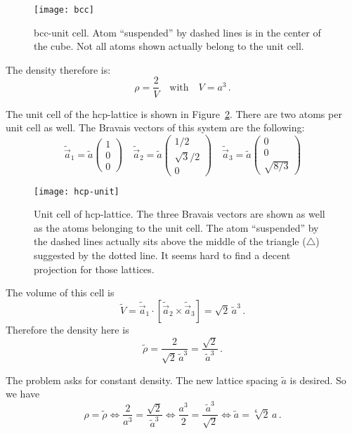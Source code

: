 \documentclass[11pt, english, fleqn, DIV=15, headinclude, BCOR=1cm]{scrartcl}
\begin{document}
\begin{figure}[htbp]
    \centering
    \texttt{[image: bcc]}
    \caption{%
        bcc-unit cell. Atom “suspended” by dashed lines is in the center of the
        cube. Not all atoms shown actually belong to the unit cell.
    }
    \label{fig:bcc}
\end{figure}

The density therefore is:
\[
    \rho = \frac{2}{V}
    \quad\text{with}\quad
    V = a^3 \,.
\]

The unit cell of the hcp-lattice is shown in Figure~\ref{fig:hcp-unit}. There
are two atoms per unit cell as well. The Bravais vectors of this system are the
following:
\[
    \tilde{\vec a}_1 =
    \tilde a
    \begin{pmatrix}
        1 \\ 0 \\ 0
    \end{pmatrix}
    \quad
    \tilde{\vec a}_2 =
    \tilde a
    \begin{pmatrix}
        1/2 \\ \sqrt{3}/2 \\ 0
    \end{pmatrix}
    \quad
    \tilde{\vec a}_3 =
    \tilde a
    \begin{pmatrix}
        0 \\ 0 \\ \sqrt{8/3}
    \end{pmatrix}
\]

\begin{figure}[htbp]
    \centering
    \texttt{[image: hcp-unit]}
    \caption{%
        Unit cell of hcp-lattice. The three Bravais vectors are shown as well
        as the atoms belonging to the unit cell. The atom “suspended” by the
        dashed lines actually sits above the middle of the triangle
        ($\bigtriangleup$) suggested by the dotted line. It seems hard to find
        a decent projection for those lattices.
    }
    \label{fig:hcp-unit}
\end{figure}

The volume of this cell is
\[
    \tilde V = \tilde{\vec a}_1 \cdot [\tilde{\vec a}_2 \times \tilde{\vec
    a}_3] = \sqrt 2 \, \tilde a^3 \,.
\]
Therefore the density here is
\[
    \tilde \rho
    = \frac{2}{\sqrt 2 \, \tilde a^3}
    = \frac{\sqrt 2}{\tilde a^3} \,.
\]

The problem asks for constant density. The new lattice spacing $\tilde a$ is
desired. So we have
\[
    \rho = \tilde \rho
    \iff
    \frac{2}{a^3} = \frac{\sqrt 2}{\tilde a^3}
    \iff
    \frac{a^3}{2} = \frac{\tilde a^3}{\sqrt 2}
    \iff
    \tilde a
    =
    \sqrt[6] 2 \, a
    \,.
\]
\end{document}
